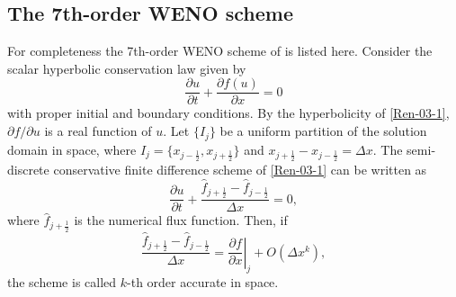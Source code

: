 \documentclass[review]{elsarticle}
\newcommand{\fr}{\frac}
\newcommand{\er}{\eqref}
\newcommand{\pat}{\partial}
\begin{document}
\subsection{The 7th-order WENO scheme}\label{sec.2.2}

For completeness the 7th-order WENO scheme of \citet{Balsara2000} is listed here. Consider the scalar hyperbolic conservation law given by
\begin{equation}\label{Ren-03-1}
  \fr{\pat u}{\pat t} + \fr{\pat f(u)}{\pat x} = 0
\end{equation}
with proper initial and boundary conditions. By the hyperbolicity of \er{Ren-03-1}, $\pat f/\pat u$ is a real function of $u$. Let $\{I_j\}$ be a uniform partition of the solution domain in space, where $I_j = \{x_{j-\fr{1}{2}}, x_{j+\fr{1}{2}} \}$ and $x_{j+ \fr{1}{2}} - x_{j-\fr{1}{2}} = \Delta x$. The semi-discrete conservative finite difference scheme of \er{Ren-03-1} can be written as
\begin{equation}\label{Ren-03-2}
  \fr{\pat u}{\pat t} + \fr{\hat f_{j+\fr{1}{2}} - \hat f_{j-\fr{1}{2}}}{\Delta x} = 0,
\end{equation}
where $\hat f_{j+\fr{1}{2}}$ is the numerical flux function. Then, if
\begin{equation}\label{Ren-03-3}
  \fr{\hat f_{j+\fr{1}{2}} - \hat f_{j-\fr{1}{2}}}{\Delta x} = \left. \fr{\pat f}{\pat x} \right|_j + O(\Delta x^k),
\end{equation}
the scheme is called $k$-th order accurate in space.
\end{document}
